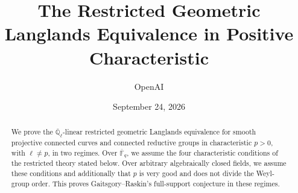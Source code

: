 \documentclass[11pt]{article}
\title{The Restricted Geometric Langlands Equivalence in Positive Characteristic}
\author{OpenAI}
\date{September 24, 2026}
\theoremstyle{definition}
\theoremstyle{remark}
\numberwithin{equation}{section}
\begin{document}
\maketitle
\begin{abstract}
We prove the $\overline{\mathbb Q}_\ell$-linear restricted geometric
Langlands equivalence for smooth projective connected curves and connected
reductive groups in characteristic $p>0$, with $\ell\ne p$, in two regimes.
Over $\overline{\mathbb F}_q$, we assume the four characteristic conditions
of the restricted theory stated below. Over arbitrary algebraically closed
fields, we assume these conditions and additionally that $p$ is very good
and does not divide the Weyl-group order.
This proves Gaitsgory--Raskin's full-support conjecture
\cite[Conjecture~1.3.10]{GR} in these regimes.
\end{abstract}
\begingroup\small\tableofcontents\endgroup









\begingroup\small


\endgroup
\end{document}
